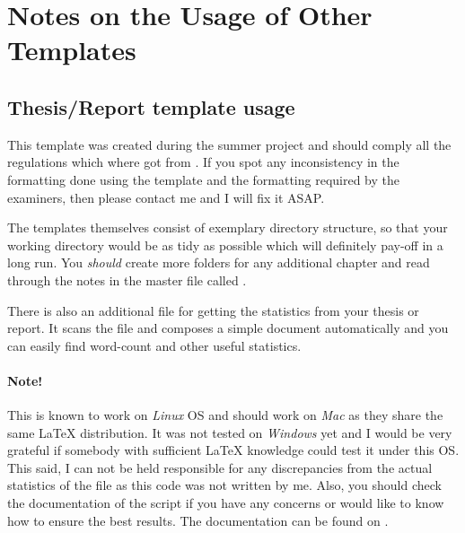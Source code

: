 \documentclass[
]{scrartcl}
\begin{document}
\section{Notes on the Usage of Other Templates}

%
\subsection{Thesis/Report template usage}

%
This template was created during the summer project and should comply all the
    regulations which where got from
    .
%
If you spot any inconsistency in the formatting done using the template and the
    formatting required by the examiners, then please contact me and I will fix
    it ASAP.

%
The templates themselves consist of exemplary directory structure, so that your
    working directory would be as tidy as possible which will definitely pay-off
    in a long run.
%
You \emph{should} create more folders for any additional chapter and read
    through the notes in the master  file called .

%
There is also an additional  file for getting the statistics
    from your thesis or report.
%
It scans the  file and composes a simple document automatically
    and you can easily find word-count and other useful statistics.

%
\paragraph{Note!} This is known to work on \emph{Linux} OS and should work on
    \emph{Mac} as they share the same \LaTeX{} distribution.
%
It was not tested on \emph{Windows} yet and I would be very grateful if somebody
    with sufficient \LaTeX{} knowledge could test it under this OS.
%
This said, I can not be held responsible for any discrepancies from the actual
    statistics of the file as this code was not written by me.
%
Also, you should check the documentation of the script if you have any concerns
    or would like to know how to ensure the best results.
%
The documentation can be found on
    .
\end{document}
